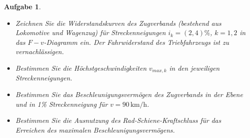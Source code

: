 \documentclass[11pt,a4paper,headsepline]{scrartcl}
\newtheorem{aufgabe}{Aufgabe}
\begin{document}
\begin{aufgabe}
	\begin{itemize}[a)]
		\item Zeichnen Sie die Widerstandskurven des Zugverbands (bestehend aus Lokomotive und Wagenzug) f\"ur Streckenneigungen $i_{k} = (2, 4) \%$, $k = 1,2$ in das $F-v$-Diagramm ein. Der Fahrwiderstand des Triebfahrzeugs ist zu vernachl\"assigen.
			\item Bestimmen Sie die H\"ochstgeschwindigkeiten $v_{max, k}$ in den jeweiligen Streckenneigungen.
		\item Bestimmen Sie das Beschleunigungsverm\"ogen des Zugverbands in der Ebene und in 1\% Streckenneigung f\"ur $v = 90\, \mathrm{km/h}$.
		\item Bestimmen Sie die Ausnutzung des Rad-Schiene-Kraftschluss f\"ur das Erreichen des maximalen Beschleunigungsverm\"ogens.
		\end{itemize}
\end{aufgabe}
\end{document}
